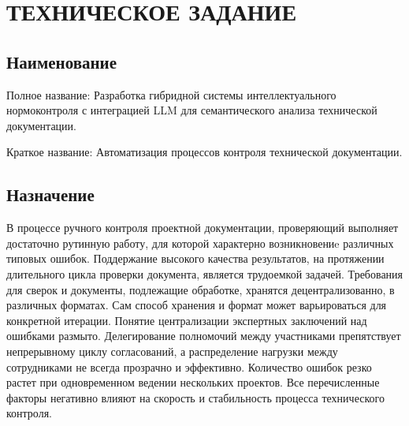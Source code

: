 \section{ТЕХНИЧЕСКОЕ ЗАДАНИЕ}

\subsection{Наименование}

Полное название: Разработка гибридной системы интеллектуального нормоконтроля с интеграцией LLM для семантического анализа технической документации.

Краткое название: Автоматизация процессов контроля технической документации.

\subsection{Назначение}

В процессе ручного контроля проектной документации, 
проверяющий выполняет достаточно рутинную работу, 
для которой характерно возникновениe различных типовых ошибок. 
Поддержание высокого качества результатов, 
на протяжении длительного цикла проверки документа, является трудоемкой задачей. 
Требования для сверок и документы, подлежащие обработке, хранятся децентрализованно, в различных форматах. 
Сам способ хранения и формат может варьироваться для конкретной итерации. 
Понятие централизации экспертных заключений над ошибками размыто. 
Делегирование полномочий между участниками препятствует непрерывному циклу согласований, 
а распределение нагрузки между сотрудниками не всегда прозрачно и эффективно. 
Количество ошибок резко растет при одновременном ведении нескольких проектов. 
Все перечисленные факторы негативно влияют на скорость и стабильность процесса технического контроля. 


